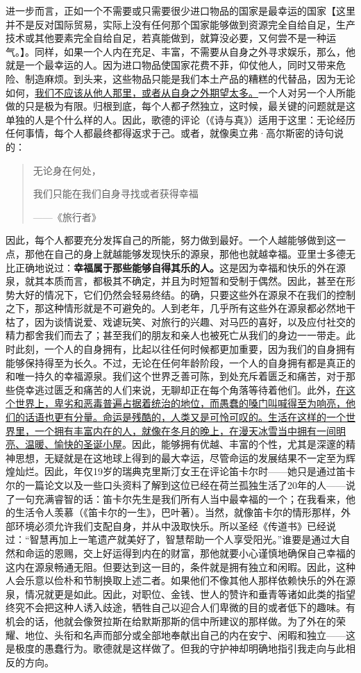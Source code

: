 \documentclass[12pt,oneside]{book}
\begin{document}
进一步而言，正如一个不需要或只需要很少进口物品的国家是最幸运的国家【这里并不是反对国际贸易，实际上没有任何那个国家能够做到资源完全自给自足，生产技术或其他要素完全自给自足，若真能做到，就算没必要，又何尝不是一种运气。】。同样，如果一个人内在充足、丰富，不需要从自身之外寻求娱乐，那么，他就是一个最幸运的人。因为进口物品使国家花费不菲，仰仗他人，同时又带来危险、制造麻烦。到头来，这些物品只能是我们本土产品的糟糕的代替品，因为无论如何，\uline{我们不应该从他人那里，或者从自身之外期望太多。}一个人对另一个人所能做的只是极为有限。归根到底，每个人都孑然独立，这时候，最关键的问题就是这单独的人是个什么样的人。因此，歌德的评论（《诗与真》）适用于这里：无论经历任何事情，每个人都最终都得返求于己。或者，就像奥立弗·高尔斯密的诗句说的： 

 
\begin{quotation}
无论身在何处， 

我们只能在我们自身寻找或者获得幸福 

——《旅行者》 
\end{quotation}


因此，每个人都要充分发挥自己的所能，努力做到最好。一个人越能够做到这一点，那他在自己的身上就越能够发现快乐的源泉，那他也就越幸福。亚里士多德无比正确地说过：\textbf{幸福属于那些能够自得其乐的人。}这是因为幸福和快乐的外在源泉，就其本质而言，都极其不确定，并且为时短暂和受制于偶然。因此，甚至在形势大好的情况下，它们仍然会轻易终结。的确，只要这些外在源泉不在我们的控制之下，那这种情形就是不可避免的。人到老年，几乎所有这些外在源泉都必然地干枯了，因为谈情说爱、戏谑玩笑、对旅行的兴趣、对马匹的喜好，以及应付社交的精力都舍我们而去了；甚至我们的朋友和亲人也被死亡从我们的身边一一带走。此时此刻，一个人的自身拥有，比起以往任何时候都更加重要，因为我们的自身拥有能够保持得至为长久。不过，无论在任何年龄阶段，一个人的自身拥有都是真正的和唯一持久的幸福源泉。我们这个世界乏善可陈，到处充斥着匮乏和痛苦，对于那些侥幸逃过匮乏和痛苦的人们来说，无聊却正在每个角落等待着他们。此外，\uline{在这个世界上，卑劣和恶毒普遍占据着统治的地位，而愚蠢的嗓门叫喊得至为响亮，他们的话语也更有分量。命运是残酷的，人类又是可怜可叹的。生活在这样的一个世界里，一个拥有丰富内在的人，就像在冬月的晚上，在漫天冰雪当中拥有一间明亮、温暖、愉快的圣诞小屋}。因此，能够拥有优越、丰富的个性，尤其是深邃的精神思想，无疑就是在这地球上得到的最大幸运，尽管命运的发展结果不一定至为辉煌灿烂。因此，年仅19岁的瑞典克里斯汀女王在评论笛卡尔时——她只是通过笛卡尔的一篇论文以及一些口头资料了解到这位已经在荷兰孤独生活了20年的人——说了一句充满睿智的话：笛卡尔先生是我们所有人当中最幸福的一个；在我看来，他的生活令人羡慕（《笛卡尔的一生》，巴叶著）。当然，就像笛卡尔的情形那样，外部环境必须允许我们支配自身，并从中汲取快乐。所以圣经《传道书》已经说过：“智慧再加上一笔遗产就美好了，智慧帮助一个人享受阳光。”谁要是通过大自然和命运的恩赐，交上好运得到内在的财富，那他就要小心谨慎地确保自己幸福的这内在源泉畅通无阻。但要达到这一目的，条件就是拥有独立和闲暇。因此，这种人会乐意以俭朴和节制换取上述二者。如果他们不像其他人那样依赖快乐的外在源泉，情况就更是如此。因此，对职位、金钱、世人的赞许和垂青等诸如此类的指望终究不会把这种人诱入歧途，牺牲自己以迎合人们卑微的目的或者低下的趣味。有机会的话，他就会像贺拉斯在给默斯那斯的信中所建议的那样做。为了外在的荣耀、地位、头衔和名声而部分或全部地奉献出自己的内在安宁、闲暇和独立——这是极度的愚蠢行为。歌德就是这样做了。但我的守护神却明确地指引我走向与此相反的方向。 
\end{document}
